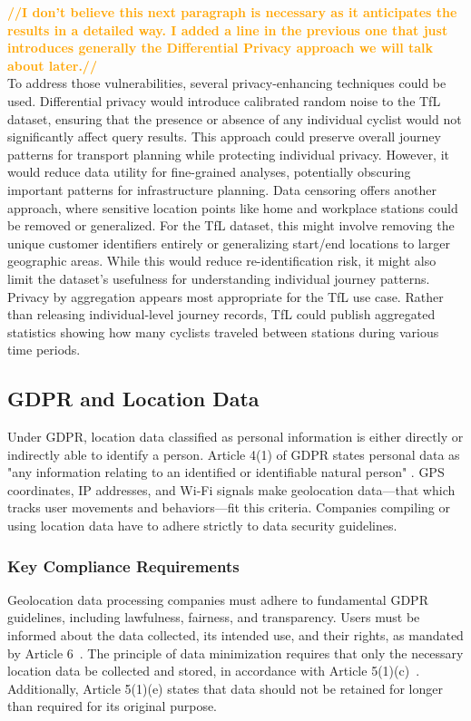 \documentclass[twocolumn]{article}
\newcommand{\later}[1]{\textbf{\textcolor{orange}{#1}}}
\begin{document}
\later{//I don't believe this next paragraph is necessary as it anticipates the results in a detailed way. I added a line in the previous one that just introduces generally the Differential Privacy approach we will talk about later.// }\\
To address those vulnerabilities, several privacy-enhancing techniques could be used. Differential privacy would introduce calibrated random noise to the TfL dataset, ensuring that the presence or absence of any individual cyclist would not significantly affect query results. This approach could preserve overall journey patterns for transport planning while protecting individual privacy. However, it would reduce data utility for fine-grained analyses, potentially obscuring important patterns for infrastructure planning. Data censoring offers another approach, where sensitive location points like home and workplace stations could be removed or generalized. For the TfL dataset, this might involve removing the unique customer identifiers entirely or generalizing start/end locations to larger geographic areas. While this would reduce re-identification risk, it might also limit the dataset's usefulness for understanding individual journey patterns. Privacy by aggregation appears most appropriate for the TfL use case. Rather than releasing individual-level journey records, TfL could publish aggregated statistics showing how many cyclists traveled between stations during various time periods.



\subsection{GDPR and Location Data}

Under GDPR, location data classified as personal information is either directly or indirectly able to identify a person. Article 4(1) of GDPR states personal data as "any information relating to an identified or identifiable natural person" \cite{gdpr_text}. GPS coordinates, IP addresses, and Wi-Fi signals make geolocation data—that which tracks user movements and behaviors—fit this criteria. Companies compiling or using location data have to adhere strictly to data security guidelines.

\subsubsection{Key Compliance Requirements}

Geolocation data processing companies must adhere to fundamental GDPR guidelines, including lawfulness, fairness, and transparency. Users must be informed about the data collected, its intended use, and their rights, as mandated by Article 6~\cite{article6_gdpr}. The principle of data minimization requires that only the necessary location data be collected and stored, in accordance with Article 5(1)(c)~\cite{article5_gdpr}. Additionally, Article 5(1)(e) states that data should not be retained for longer than required for its original purpose.  
\end{document}
